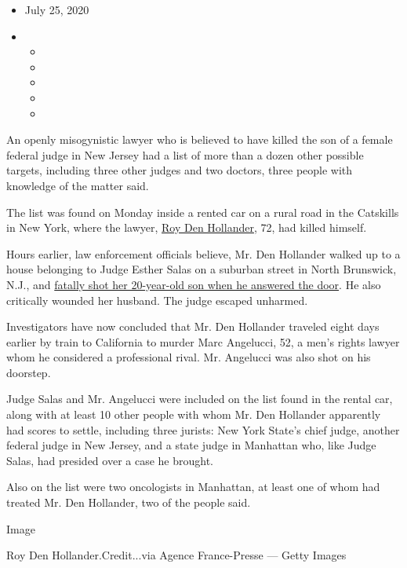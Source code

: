 \begin{itemize}
\item
  July 25, 2020
\item
  \begin{itemize}
  \item
  \item
  \item
  \item
  \item
  \end{itemize}
\end{itemize}

An openly misogynistic lawyer who is believed to have killed the son of
a female federal judge in New Jersey had a list of more than a dozen
other possible targets, including three other judges and two doctors,
three people with knowledge of the matter said.

The list was found on Monday inside a rented car on a rural road in the
Catskills in New York, where the lawyer,
\href{https://www.nytimes.com/2020/07/25/nyregion/roy-den-hollander-esther-salas-list.html}{Roy
Den Hollander}, 72, had killed himself.

Hours earlier, law enforcement officials believe, Mr. Den Hollander
walked up to a house belonging to Judge Esther Salas on a suburban
street in North Brunswick, N.J., and
\href{https://www.nytimes.com/2020/07/20/nyregion/esther-salas.html}{fatally
shot her 20-year-old son when he answered the door}. He also critically
wounded her husband. The judge escaped unharmed.

Investigators have now concluded that Mr. Den Hollander traveled eight
days earlier by train to California to murder Marc Angelucci, 52, a
men's rights lawyer whom he considered a professional rival. Mr.
Angelucci was also shot on his doorstep.

Judge Salas and Mr. Angelucci were included on the list found in the
rental car, along with at least 10 other people with whom Mr. Den
Hollander apparently had scores to settle, including three jurists: New
York State's chief judge, another federal judge in New Jersey, and a
state judge in Manhattan who, like Judge Salas, had presided over a case
he brought.

Also on the list were two oncologists in Manhattan, at least one of whom
had treated Mr. Den Hollander, two of the people said.

Image

Roy Den Hollander.Credit...via Agence France-Presse --- Getty Images

